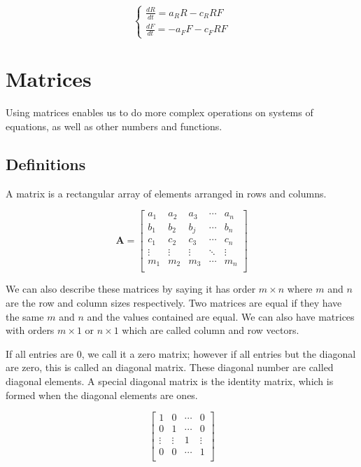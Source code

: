 \documentclass[12pt, landscape, twocolumn]{article}
\begin{document}
        \begin{equation}\label{eq:LVeq}
        \begin{cases}
        \frac{dR}{dt} = a_R R - c_R RF\\
        \frac{dF}{dt} = -a_F F - c_F RF
        \end{cases}
        \end{equation}

\section{Matrices}
    Using matrices enables us to do more complex operations on systems of equations, as well as other numbers and functions.

    \subsection{Definitions}
    A matrix is a rectangular array of elements arranged in rows and columns.

    \begin{equation}\label{eq:matrixdef}
    \mathbf{A} =
    \left[ \begin{matrix}
        a_1 & a_2 & a_3 & \cdots & a_n\\
        b_1 & b_2 & b_j & \cdots & b_n\\
        c_1 & c_2 & c_3 & \cdots & c_n\\
        \vdots & \vdots & \vdots & \ddots & \vdots\\
        m_1 & m_2 & m_3 & \cdots & m_n\\
    \end{matrix} \right]
    \end{equation}

    We can also describe these matrices by saying it has order $m \times n$ where $m$ and $n$ are the row and column sizes respectively. Two matrices are equal if they have the same $m$ and $n$ and the values contained are equal. We can also have matrices with orders $m \times 1$ or $n \times 1$ which are called column and row vectors.

    If all entries are 0, we call it a zero matrix; however if all entries but the diagonal are zero, this is called an diagonal matrix. These diagonal number are called diagonal elements. A special diagonal matrix is the identity matrix, which is formed when the diagonal elements are ones.

    \begin{equation}\label{eq:id_matrix}
        \left[ \begin{array}{cccc}
        1 & 0 & \cdots & 0\\
        0 & 1 & \cdots & 0\\
        \vdots & \vdots & 1 & \vdots\\
        0 & 0 & \cdots & 1\\
        \end{array} \right]
    \end{equation}
\end{document}
